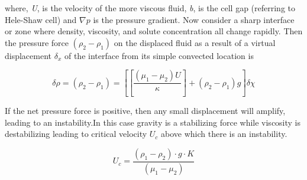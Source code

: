 \documentclass[preprint,authoryear,12pt]{elsarticle}
\begin{document}
where, \textit{U}, is the velocity of the more viscous fluid, \textit{b}, is the cell gap (referring to Hele-Shaw cell) and \textit{$\nabla p$} is the pressure gradient. Now consider a sharp interface or zone where density, viscosity, and solute concentration all change rapidly. Then the pressure force $(\rho_2-\rho_1)$ on the displaced fluid as a result of a virtual displacement $\delta_x$ of the interface from its simple convected location is 

\begin{equation}
\delta\rho=(\rho_2-\rho_1)=[[\frac{(\mu_1-\mu_2)U}{\kappa}]+(\rho_2-\rho_1)g] \delta\chi
\end{equation}

If the net pressure force is positive, then any small displacement will amplify, leading to an instability.In this case gravity is a stabilizing force while viscosity is destabilizing leading to critical velocity $U_c$ above which there is an instability.

\begin{equation}
U_c = \frac{(\rho_1-\rho_2) \cdot g \cdot K}{(\mu_1-\mu_2)}
\end{equation}

  






\pagebreak
\clearpage

%

\pagebreak
\clearpage

\listoffigures


\end{document}

